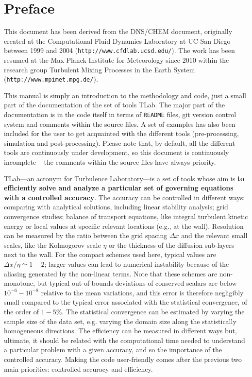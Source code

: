 \chapter*{Preface}
\sloppy

This document has been derived from the DNS/CHEM document, originally created at the Computational Fluid Dynamics Laboratory at UC San Diego between 1999 and 2004 ({\tt http://www.cfdlab.ucsd.edu/}). The work has been resumed at the Max Planck Institute for Meteorology since 2010 within the research group Turbulent Mixing Processes in the Earth System ({\tt http://www.mpimet.mpg.de/}).

This manual is simply an introduction to the methodology and code, just a small part of the documentation of the set of tools TLab. The major part of the documentation is in the code itself in terms of {\tt README} files, git version control system and comments within the source files. A set of examples has also been included for the user to get acquainted with the different tools (pre-processing, simulation and post-processing). Please note that, by default, all the different tools are continuously under development, so this document is continuously incomplete -- the comments within the source files have always priority.

TLab---an acronym for Turbulence Laboratory---is a set of tools whose aim is {\bf to efficiently solve and analyze a particular set of governing equations with a controlled accuracy}. The accuracy can be controlled in different ways: comparing with analytical solutions, including linear stability analysis; grid convergence studies; balance of transport equations, like integral turbulent kinetic energy or local values at specific relevant locations (e.g., at the wall). Resolution can be measured by the ratio between the grid spacing $\Delta x$ and the relevant small scales, like the Kolmogorov scale $\eta$ or the thickness of the diffusion sub-layers next to the wall. For the compact schemes used here, typical values are $\Delta x/\eta\simeq 1-2$; larger values can lead to numerical instability because of the aliasing generated by the non-linear terms. Note that these schemes are non-monotone, but typical out-of-bounds deviations of conserved scalars are below $10^{-6}-10^{-8}$ relative to the mean variations, and this error is therefore negligibly small compared to the typical error associated with the statistical convergence, of the order of $1-5$\%. The statistical convergence can be estimated by varying the sample size of the data set, e.g. varying the domain size along the statistically homogeneous directions. The efficiency can be measured in different ways but, ultimate, it should be related with the computational time needed to understand a particular problem with a given accuracy, and so the importance of the controlled accuracy. Making the code user-friendly comes after the previous two main priorities: controlled accuracy and efficiency.

